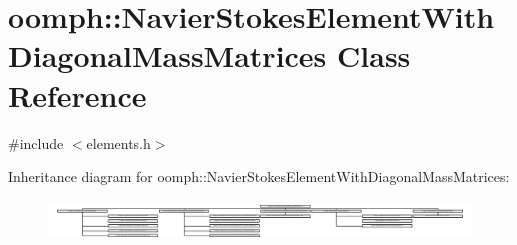 \hypertarget{classoomph_1_1NavierStokesElementWithDiagonalMassMatrices}{}\section{oomph\+:\+:Navier\+Stokes\+Element\+With\+Diagonal\+Mass\+Matrices Class Reference}
\label{classoomph_1_1NavierStokesElementWithDiagonalMassMatrices}


{\ttfamily \#include $<$elements.\+h$>$}

Inheritance diagram for oomph\+:\+:Navier\+Stokes\+Element\+With\+Diagonal\+Mass\+Matrices\+:\begin{figure}[H]
\begin{center}
\leavevmode
\includegraphics[height=1.081678cm]{classoomph_1_1NavierStokesElementWithDiagonalMassMatrices}
\end{center}
\end{figure}
